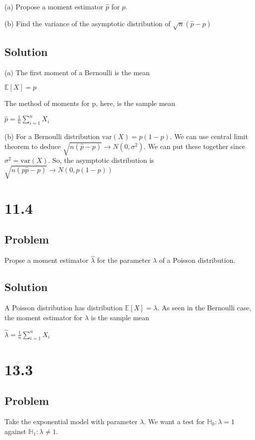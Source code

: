 \documentclass[10pt, a4paper]{article}
\newcommand{\EE}{\mathbb E}
\begin{document}
\begin{*align}
      (a) Propose a moment estimator $\hat p$ for $p$.

      (b) Find the variance of the asymptotic distribution of $\sqrt{n}(\hat p-p)$

    \subsection*{Solution}
      (a) The first moment of a Bernoulli is the mean
      \begin{center}
        $\mathbb{E}[X]=p$
      \end{center}
      The method of moments for p, here, is the sample mean
      \begin{center}
        $\boxed{\hat p = \frac{1}{n}\sum_{i=1}^nX_i}$
      \end{center}
      (b) For a Bernoulli distribution $\text{var}(X)=p(1-p)$. We can use central limit theorem to deduce $\sqrt{n(\hat p-p)}\rightarrow N(0,\sigma^2)$. We can put these together since $\sigma^2 = \text{var}(X)$. So, the asymptotic distribution is $\sqrt{n(p\hat p-p)} \rightarrow N(0,p(1-p))$ 
  \section*{11.4}
    \subsection*{Problem}
      Propse a moment estimator $\hat\lambda$ for the parameter $\lambda$ of a Poisson distribution.  
    \subsection*{Solution}
      A Poisson distribution has distribution $\EE[X]=\lambda$. As seen in the Bernoulli case, the moment estimator for $\lambda$ is the sample mean
      \begin{center}
        $\boxed{\hat\lambda = \frac{1}{n}\sum_{i=1}^n X_i}$
      \end{center}
  \section*{13.3}
    \subsection*{Problem}
      Take the exponential model with parameter $\lambda$. We want a test for $\mathbb{H}_0:\lambda=1$ against $\mathbb{H}_1:\lambda\ne1$.


\end{*align}
\end{document}
